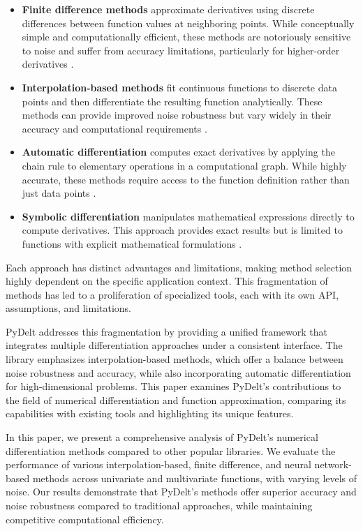 \documentclass[11pt,a4paper]{article}
\begin{document}
\begin{itemize}
    \item \textbf{Finite difference methods} approximate derivatives using discrete differences between function values at neighboring points. While conceptually simple and computationally efficient, these methods are notoriously sensitive to noise and suffer from accuracy limitations, particularly for higher-order derivatives \citep{fornberg1988generation}.
    
    \item \textbf{Interpolation-based methods} fit continuous functions to discrete data points and then differentiate the resulting function analytically. These methods can provide improved noise robustness but vary widely in their accuracy and computational requirements \citep{de2001numerical}.
    
    \item \textbf{Automatic differentiation} computes exact derivatives by applying the chain rule to elementary operations in a computational graph. While highly accurate, these methods require access to the function definition rather than just data points \citep{baydin2018automatic}.
    
    \item \textbf{Symbolic differentiation} manipulates mathematical expressions directly to compute derivatives. This approach provides exact results but is limited to functions with explicit mathematical formulations \citep{sympy2017}.
\end{itemize}

Each approach has distinct advantages and limitations, making method selection highly dependent on the specific application context. This fragmentation of methods has led to a proliferation of specialized tools, each with its own API, assumptions, and limitations.

PyDelt addresses this fragmentation by providing a unified framework that integrates multiple differentiation approaches under a consistent interface. The library emphasizes interpolation-based methods, which offer a balance between noise robustness and accuracy, while also incorporating automatic differentiation for high-dimensional problems. This paper examines PyDelt's contributions to the field of numerical differentiation and function approximation, comparing its capabilities with existing tools and highlighting its unique features.

In this paper, we present a comprehensive analysis of PyDelt's numerical differentiation methods compared to other popular libraries. We evaluate the performance of various interpolation-based, finite difference, and neural network-based methods across univariate and multivariate functions, with varying levels of noise. Our results demonstrate that PyDelt's methods offer superior accuracy and noise robustness compared to traditional approaches, while maintaining competitive computational efficiency.
\end{document}

